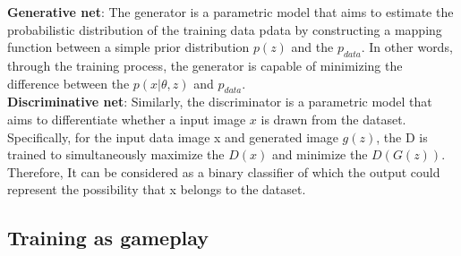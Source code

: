 \documentclass[10pt,twocolumn,letterpaper]{article}
\begin{document}
\textbf{Generative net}: 
The generator is a parametric model that aims to estimate the probabilistic distribution of the training data pdata by constructing a mapping function between a simple prior distribution $p(z)$  and the $p_{data}$. In other words, through the training process, the generator is capable of minimizing the difference between the $p(x|\theta,z)$ and $p_{data}$.\\ 

\textbf{Discriminative net}:
Similarly, the discriminator is a parametric model that aims to differentiate whether a input image $x$ is drawn from the dataset. Specifically, for the input data image x and generated image $g(z)$, the D is trained to simultaneously maximize the $D(x)$ and minimize the  $D(G(z))$. Therefore, It can be considered as a binary classifier of which the output could represent the possibility that x belongs to the dataset.   


\subsection{Training as gameplay}
\end{document}
